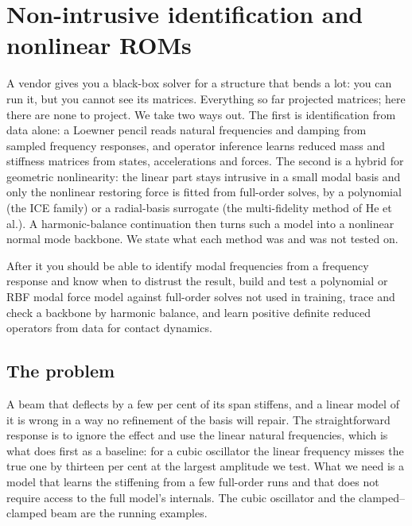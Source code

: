 \chapter{Non-intrusive identification and nonlinear ROMs}\label{ch:nonint}

\begin{tcolorbox}[colback=hpale,colframe=hnavy!60,coltitle=white,colbacktitle=hnavy!85,title={In this chapter}]
A vendor gives you a black-box solver for a structure that bends a lot: you can run it, but you cannot see its matrices. Everything so far projected matrices; here there are none to project. We take two ways out. The first is identification from data alone: a Loewner pencil reads natural frequencies and damping from sampled frequency responses, and operator inference learns reduced mass and stiffness matrices from states, accelerations and forces. The second is a hybrid for geometric nonlinearity: the linear part stays intrusive in a small modal basis and only the nonlinear restoring force is fitted from full-order solves, by a polynomial (the ICE family) or a radial-basis surrogate (the multi-fidelity method of He et al.). A harmonic-balance continuation then turns such a model into a nonlinear normal mode backbone. We state what each method was and was not tested on.\par\smallskip
After it you should be able to identify modal frequencies from a frequency response and know when to distrust the result, build and test a polynomial or RBF modal force model against full-order solves not used in training, trace and check a backbone by harmonic balance, and learn positive definite reduced operators from data for contact dynamics.
\end{tcolorbox}

\section{The problem}\label{sec:ni-problem}

A beam that deflects by a few per cent of its span stiffens, and a linear model of it is wrong in a way no refinement of the basis will repair. The straightforward response is to ignore the effect and use the linear natural frequencies, which is what  does first as a baseline: for a cubic oscillator the linear frequency misses the true one by thirteen per cent at the largest amplitude we test. What we need is a model that learns the stiffening from a few full-order runs and that does not require access to the full model's internals. The cubic oscillator and the clamped--clamped beam are the running examples.

